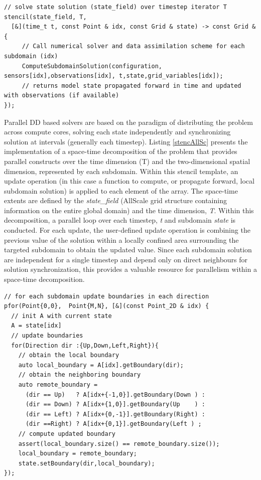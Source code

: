 \documentclass[conference,compsoc]{IEEEtran}
\begin{document}
\begin{lstlisting}[caption=AllScale Stencil parallel computation, label=stencAllSc]
// solve state solution (state_field) over timestep iterator T
stencil(state_field, T,
  [&](time_t t, const Point & idx, const Grid & state) -> const Grid & {
     // Call numerical solver and data assimilation scheme for each subdomain (idx)
     ComputeSubdomainSolution(configuration, sensors[idx],observations[idx], t,state,grid_variables[idx]);
     // returns model state propagated forward in time and updated with observations (if available)
});
\end{lstlisting}


Parallel DD based solvers are based on the paradigm of distributing the problem across compute cores, solving each state independently and synchronizing solution at intervals (generally each timestep). Listing \ref{stencAllSc} presents the implementation of a space-time decomposition of the problem that provides parallel constructs over the time dimension (T) and the two-dimensional spatial dimension, represented by each subdomain. Within this stencil template, an update operation (in this case a function to compute, or propagate forward, local subdomain solution) is applied to each element of the array. The space-time extents are defined by the \textit{state\_field} (AllScale grid structure containing information on the entire global domain) and the time dimension, \textit{T}. Within this decomposition, a parallel loop over each timestep, \textit{t} and subdomain \textit{state} is conducted. For each update, the user-defined update operation is combining the previous value of the solution within a locally confined area surrounding the targeted subdomain to obtain the updated value. Since each subdomain solution are independent for a single timestep and depend only on direct neighbours for solution synchronization, this provides a valuable resource for parallelism within a space-time decomposition. 

\begin{lstlisting}[caption=AllScale boundary exchange implementation, label=boundAllScale]
// for each subdomain update boundaries in each direction
pfor(Point{0,0},  Point{M,N}, [&](const Point_2D & idx) {
  // init A with current state
  A = state[idx]
  // update boundaries
  for(Direction dir :{Up,Down,Left,Right}){
    // obtain the local boundary
    auto local_boundary = A[idx].getBoundary(dir);
    // obtain the neighboring boundary
    auto remote_boundary =
      (dir == Up)   ? A[idx+{-1,0}].getBoundary(Down ) :
      (dir == Down) ? A[idx+{1,0}].getBoundary(Up    ) :
      (dir == Left) ? A[idx+{0,-1}].getBoundary(Right) :
      (dir ==Right) ? A[idx+{0,1}].getBoundary(Left ) ;
    // compute updated boundary
    assert(local_boundary.size() == remote_boundary.size());
    local_boundary = remote_boundary;
    state.setBoundary(dir,local_boundary);
});
\end{lstlisting}
\end{document}

